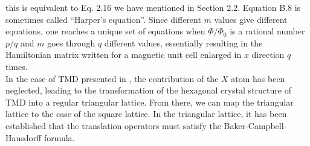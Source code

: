 \documentclass{report}
\begin{document}
this is equivalent to Eq. 2.16 we have mentioned in Section 2.2. Equation B.8 is sometimes called ``Harper's equation''. \cite{harper1955general} Since different $m$ values give different equations, one reaches a unique set of equations when $\Phi / \Phi_{0}$ is a rational number $p / q$ and $m$ goes through $q$ different values, essentially resulting in the Hamiltonian matrix written for a magnetic unit cell enlarged in $x$ direction $q$ times.\\
In the case of TMD presented in \cite{PhysRevB.88.085433}, the contribution of the
$X$ atom has been neglected, leading to the transformation of the hexagonal crystal structure of TMD into a regular triangular lattice. From there, we can map the triangular lattice to the case of the square lattice. In the triangular lattice, it has been established that the translation operators must satisfy the Baker-Campbell-Hausdorff formula.
\end{document}

